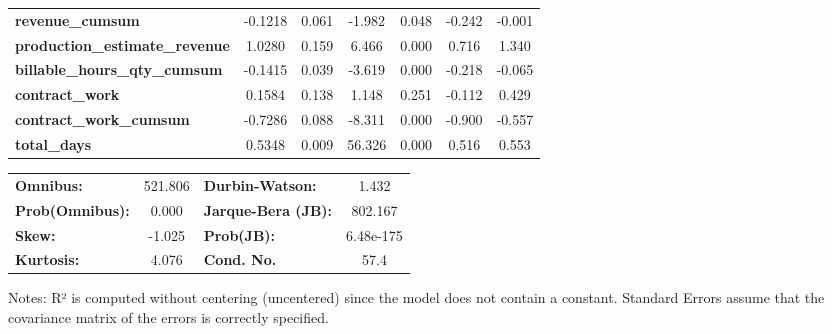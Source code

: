 \begin{center}
\begin{tabular}{lcccccc}
\textbf{revenue\_cumsum}               &      -0.1218  &        0.061     &    -1.982  &         0.048        &       -0.242    &       -0.001     \\
\textbf{production\_estimate\_revenue} &       1.0280  &        0.159     &     6.466  &         0.000        &        0.716    &        1.340     \\
\textbf{billable\_hours\_qty\_cumsum}  &      -0.1415  &        0.039     &    -3.619  &         0.000        &       -0.218    &       -0.065     \\
\textbf{contract\_work}                &       0.1584  &        0.138     &     1.148  &         0.251        &       -0.112    &        0.429     \\
\textbf{contract\_work\_cumsum}        &      -0.7286  &        0.088     &    -8.311  &         0.000        &       -0.900    &       -0.557     \\
\textbf{total\_days}                   &       0.5348  &        0.009     &    56.326  &         0.000        &        0.516    &        0.553     \\
\bottomrule
\end{tabular}
\begin{tabular}{lclc}
\textbf{Omnibus:}       & 521.806 & \textbf{  Durbin-Watson:     } &     1.432  \\
\textbf{Prob(Omnibus):} &   0.000 & \textbf{  Jarque-Bera (JB):  } &   802.167  \\
\textbf{Skew:}          &  -1.025 & \textbf{  Prob(JB):          } & 6.48e-175  \\
\textbf{Kurtosis:}      &   4.076 & \textbf{  Cond. No.          } &      57.4  \\
\bottomrule
\end{tabular}
\end{center}

Notes: \newline
 [1] R² is computed without centering (uncentered) since the model does not contain a constant. \newline
 [2] Standard Errors assume that the covariance matrix of the errors is correctly specified.